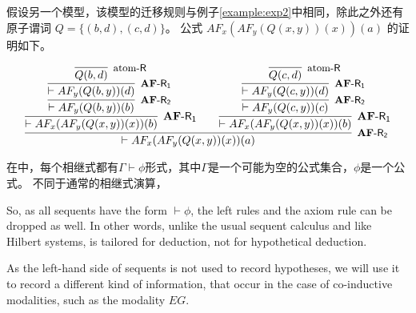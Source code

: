\begin{example}\label{example:exp3}
		假设另一个模型，该模型的迁移规则与例子\ref{example:exp2}中相同，除此之外还有原子谓词 $Q=\{(b,d), (c,d)\}$。
		公式 $AF_x(AF_y(Q(x, y))(x))(a)$ 的证明如下。
		
		$$\infer[{\mbox{\small $\mathbf{AF}$-{$\mathsf{R_2}$}}}]
		{\vdash AF_x(AF_y(Q(x, y))(x))(a)}
		{\infer[\mbox{$\mathbf{AF}$-{$\mathsf{R_1}$}}]
			{\vdash AF_x(AF_y(Q(x, y))(x))(b)}
			{\infer[{\mbox{\small $\mathbf{AF}$-{$\mathsf{R_2}$}}}]
				{\vdash AF_y(Q(b, y))(b)}
				{\infer[\mbox{\small $\mathbf{AF}$-{$\mathsf{R_1}$}}]
					{\vdash AF_y(Q(b, y))(d)}
					{\infer[\mbox{\small atom-\textsf{R}}]
						{Q(b,d)}
						{}
					}
				}
			}
			\quad\quad
			\infer[\mbox{$\mathbf{AF}$-{$\mathsf{R_1}$}}]
			{\vdash AF_x(AF_y(Q(x, y))(x))(b)}
			{\infer[{\mbox{\small $\mathbf{AF}$-{$\mathsf{R_2}$}}}]
				{\vdash AF_y(Q(c, y))(c)}
				{\infer[\mbox{\small $\mathbf{AF}$-{$\mathsf{R_1}$}}]
					{\vdash AF_y(Q(c, y))(d)}
					{\infer[\mbox{\small atom-\textsf{R}}]
						{Q(c,d)}
						{}
					}
				}
			}
		}$$
		
\end{example}


在\SCTL{}中，每个相继式都有$\Gamma\vdash\phi$形式，其中$\Gamma$是一个可能为空的\SCTL{}公式集合，$\phi$是一个\SCTL{}公式。 不同于通常的相继式演算，

So, as all sequents have the form $\vdash \phi$, the left rules and
the axiom rule can be dropped as well.  In other words, unlike the
usual sequent calculus and like Hilbert systems, \SCTL{} is tailored for
deduction, not for hypothetical deduction.



As the left-hand side of sequents is not used to record hypotheses, 
we will use it to record a different kind of information, that occur
in the case of co-inductive modalities, such as the modality $EG$. 

